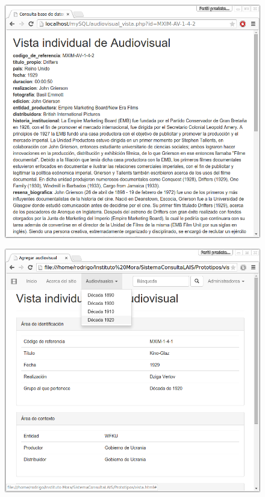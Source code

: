 \documentclass{beamer}
\begin{document}
\begin{frame}
	\begin{figure}[H]
		\centering
		\includegraphics[keepaspectratio=true,width=\linewidth]{Prototipo_05.png}
		\label{fig:prueba_formulario_2}
	\end{figure}	
\end{frame}

\begin{frame}
	\begin{figure}[H]
		\centering
		\includegraphics[keepaspectratio=true,width=\linewidth]{Prototipo_06.png}
		\label{fig:prueba_formulario_2}
	\end{figure}	
\end{frame}
\end{document}
